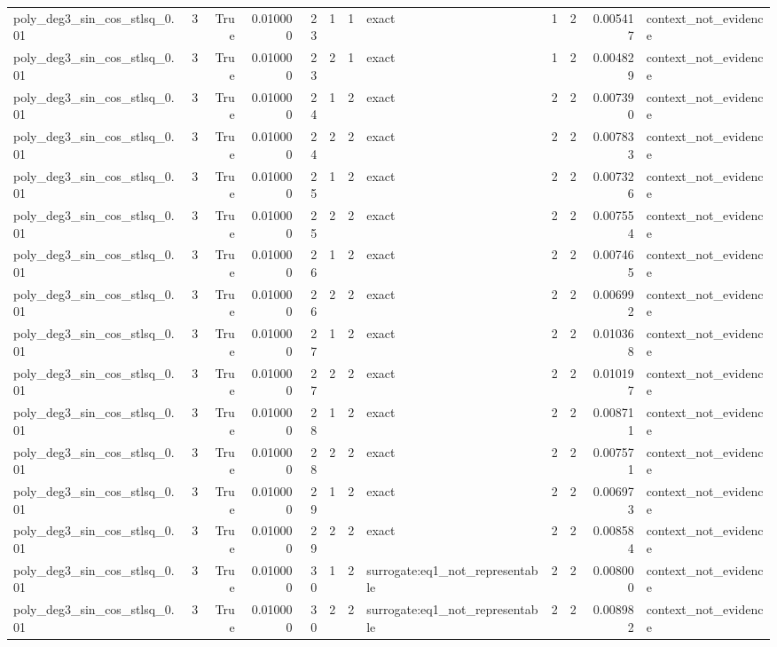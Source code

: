 \begin{tabular}{lrrrrrrlrrrl}
poly\_deg3\_sin\_cos\_stlsq\_0.01 & 3 & True & 0.010000 & 23 & 1 & 1 & exact & 1 & 2 & 0.005417 & context\_not\_evidence \\
poly\_deg3\_sin\_cos\_stlsq\_0.01 & 3 & True & 0.010000 & 23 & 2 & 1 & exact & 1 & 2 & 0.004829 & context\_not\_evidence \\
poly\_deg3\_sin\_cos\_stlsq\_0.01 & 3 & True & 0.010000 & 24 & 1 & 2 & exact & 2 & 2 & 0.007390 & context\_not\_evidence \\
poly\_deg3\_sin\_cos\_stlsq\_0.01 & 3 & True & 0.010000 & 24 & 2 & 2 & exact & 2 & 2 & 0.007833 & context\_not\_evidence \\
poly\_deg3\_sin\_cos\_stlsq\_0.01 & 3 & True & 0.010000 & 25 & 1 & 2 & exact & 2 & 2 & 0.007326 & context\_not\_evidence \\
poly\_deg3\_sin\_cos\_stlsq\_0.01 & 3 & True & 0.010000 & 25 & 2 & 2 & exact & 2 & 2 & 0.007554 & context\_not\_evidence \\
poly\_deg3\_sin\_cos\_stlsq\_0.01 & 3 & True & 0.010000 & 26 & 1 & 2 & exact & 2 & 2 & 0.007465 & context\_not\_evidence \\
poly\_deg3\_sin\_cos\_stlsq\_0.01 & 3 & True & 0.010000 & 26 & 2 & 2 & exact & 2 & 2 & 0.006992 & context\_not\_evidence \\
poly\_deg3\_sin\_cos\_stlsq\_0.01 & 3 & True & 0.010000 & 27 & 1 & 2 & exact & 2 & 2 & 0.010368 & context\_not\_evidence \\
poly\_deg3\_sin\_cos\_stlsq\_0.01 & 3 & True & 0.010000 & 27 & 2 & 2 & exact & 2 & 2 & 0.010197 & context\_not\_evidence \\
poly\_deg3\_sin\_cos\_stlsq\_0.01 & 3 & True & 0.010000 & 28 & 1 & 2 & exact & 2 & 2 & 0.008711 & context\_not\_evidence \\
poly\_deg3\_sin\_cos\_stlsq\_0.01 & 3 & True & 0.010000 & 28 & 2 & 2 & exact & 2 & 2 & 0.007571 & context\_not\_evidence \\
poly\_deg3\_sin\_cos\_stlsq\_0.01 & 3 & True & 0.010000 & 29 & 1 & 2 & exact & 2 & 2 & 0.006973 & context\_not\_evidence \\
poly\_deg3\_sin\_cos\_stlsq\_0.01 & 3 & True & 0.010000 & 29 & 2 & 2 & exact & 2 & 2 & 0.008584 & context\_not\_evidence \\
poly\_deg3\_sin\_cos\_stlsq\_0.01 & 3 & True & 0.010000 & 30 & 1 & 2 & surrogate:eq1\_not\_representable & 2 & 2 & 0.008000 & context\_not\_evidence \\
poly\_deg3\_sin\_cos\_stlsq\_0.01 & 3 & True & 0.010000 & 30 & 2 & 2 & surrogate:eq1\_not\_representable & 2 & 2 & 0.008982 & context\_not\_evidence \\

\end{tabular}
